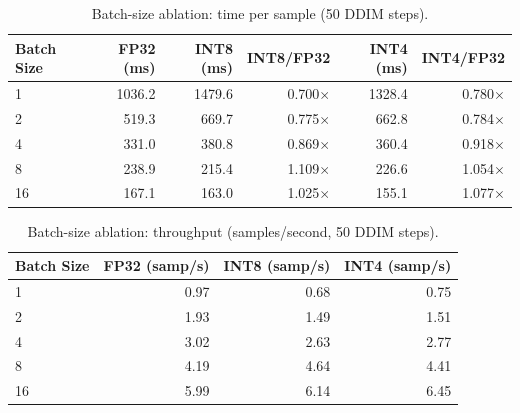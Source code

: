 \begin{table}[htbp]
\centering
\small
\caption{Batch-size ablation: time per sample (50 DDIM steps).}
\label{tab:batch_latency}
\begin{tabular}{lrrrrr}
\toprule
Batch Size & FP32 (ms) & INT8 (ms) & INT8/FP32 & INT4 (ms) & INT4/FP32 \\
\midrule
1 & 1036.2 & 1479.6 & 0.700$\times$ & 1328.4 & 0.780$\times$ \\
2 & 519.3 & 669.7 & 0.775$\times$ & 662.8 & 0.784$\times$ \\
4 & 331.0 & 380.8 & 0.869$\times$ & 360.4 & 0.918$\times$ \\
8 & 238.9 & 215.4 & 1.109$\times$ & 226.6 & 1.054$\times$ \\
16 & 167.1 & 163.0 & 1.025$\times$ & 155.1 & 1.077$\times$ \\
\bottomrule
\end{tabular}
\end{table}

\begin{table}[htbp]
\centering
\small
\caption{Batch-size ablation: throughput (samples/second, 50 DDIM steps).}
\label{tab:batch_throughput}
\begin{tabular}{lrrr}
\toprule
Batch Size & FP32 (samp/s) & INT8 (samp/s) & INT4 (samp/s) \\
\midrule
1 & 0.97 & 0.68 & 0.75 \\
2 & 1.93 & 1.49 & 1.51 \\
4 & 3.02 & 2.63 & 2.77 \\
8 & 4.19 & 4.64 & 4.41 \\
16 & 5.99 & 6.14 & 6.45 \\
\bottomrule
\end{tabular}
\end{table}
